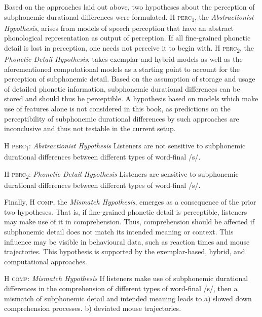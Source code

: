 Based on the approaches laid out above, two hypotheses about the perception of subphonemic durational differences were formulated. \textsc{H perc\textsubscript{1}}, the \textit{Abstractionist Hypothesis}, arises from models of speech perception that have an abstract phonological representation as output of perception. If all fine-grained phonetic detail is lost in perception, one needs not perceive it to begin with. \textsc{H perc\textsubscript{2}}, the \textit{Phonetic Detail Hypothesis}, takes exemplar and hybrid models as well as the aforementioned computational models as a starting point to account for the perception of subphonemic detail. Based on the assumption of storage and usage of detailed phonetic information, subphonemic durational differences can be stored and should thus be perceptible. A hypothesis based on models which make use of features alone is not considered in this book, as predictions on the perceptibility of subphonemic durational differences by such approaches are inconclusive and thus not testable in the current setup.

\begin{description}
\item\textsc{H perc\textsubscript{1}}: \textit{Abstractionist Hypothesis} \newline
Listeners are not sensitive to subphonemic durational differences between different types of word-final /s/.

\item\textsc{H perc\textsubscript{2}}: \textit{Phonetic Detail Hypothesis} \newline
Listeners are sensitive to subphonemic durational differences between different types of word-final /s/.
\end{description}

Finally, \textsc{H comp}, the \textit{Mismatch Hypothesis}, emerges as a consequence of the prior two hypotheses. That is, if fine-grained phonetic detail is perceptible, listeners may make use of it in comprehension. Thus, comprehension should be affected if subphonemic detail does not match its intended meaning or context. This influence may be visible in behavioural data, such as reaction times and mouse trajectories. This hypothesis is supported by the exemplar-based, hybrid, and computational approaches.

\begin{description}

\item\textsc{H comp}: \textit{Mismatch Hypothesis} \newline
If listeners make use of subphonemic durational differences in the comprehension of different types of word-final /s/, then a mismatch of subphonemic detail and intended meaning leads to\newline
a) slowed down comprehension processes.\newline
b) deviated mouse trajectories.

\end{description}

